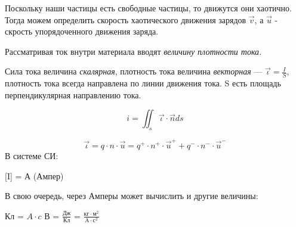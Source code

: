 \documentclass[../main.tex]{subfiles}
\begin{document}
Поскольку наши частицы есть свободные частицы, то движутся они хаотично. Тогда можем определить скорость хаотического движения зарядов $\vec v$,
а $\vec u$ - скрость упорядоченного движения заряда.

Рассматривая ток внутри материала вводят \textit{величину плотности тока.}

Сила тока величина \textit{скалярная}, плотность тока величина \textit{векторная} --- $\vec \iota = \frac{I}{S}$,
плотность тока всегда направлена по линии движения тока. S есть площадь перпендикулярная направлению тока.

\[i = \iint_{s} \vec \iota \cdot \vec n ds\]

\[\vec \iota = q \cdot n \cdot \vec u = q^{+} \cdot n^{+} \cdot \vec u^{+} + q^{-} \cdot n^{-} \cdot \vec u^{-}\]
В системе СИ:

[I] = А (Ампер)

В свою очередь, через Амперы может вычислить и другие величины:
\begin{center}
    Кл = $A \cdot c$
    В = $\frac{\text{Дж}}{\text{Кл}}$ = $\frac{\text{кг} \cdot \text{м}^2}{\text{A} \cdot \text{с}^2}$
\end{center}
\end{document}
